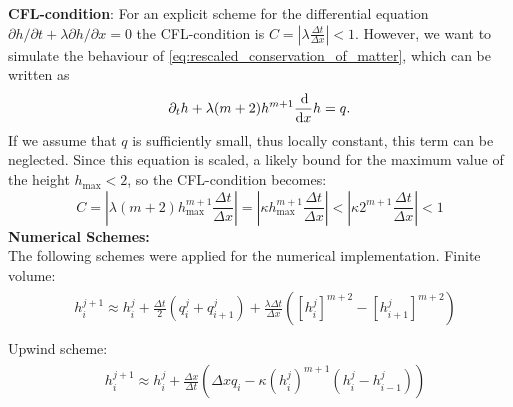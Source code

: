 \textbf{CFL-condition}:
For an explicit scheme for the differential equation $\partial h/\partial t + \lambda \partial h/ \partial x = 0$ the CFL-condition is $C = \left | \lambda \frac{\Delta t}{\Delta x}\right| < 1$.
%
However, we want to simulate the behaviour of \eqref{eq:rescaled_conservation_of_matter}, which can be written as
%
\begin{equation}
    \partial_th+\lambda (m+2)h^{m+1} \frac{\dif}{\dif{x}}h = q.
\end{equation}
%
If we assume that $q$ is sufficiently small, thus locally constant, this term can be neglected. Since this equation is scaled, a likely bound for the maximum value of the height $h_{\text{max}} < 2$, so the CFL-condition becomes:
\begin{equation*}
    C = \left | \lambda (m+2) h_\text{max}^{m+1} \frac{\Delta t}{\Delta x}\right| =\left | \kappa h_{\text{max}}^{m+1} \frac{\Delta t}{\Delta x}\right| < \left | \kappa 2^{m+1} \frac{\Delta t}{\Delta x}\right| < 1
\end{equation*}
%
\textbf{Numerical Schemes:}\\
The following schemes were applied for the numerical implementation.
%
Finite volume:
%
\begin{align} \label{eq:finite_volume_scheme}
    \begin{split}
        & h_i^{j+1} \approx h_i^{j} + \frac{\Delta t}{2} \left (q_i^j + q_{i+1}^j \right) + \frac{\lambda \Delta t}{\Delta x} \left( \left [h_i^j\right]^{m+2} - \left[h_{i+1}^j\right]^{m+2}\right) \\
    \end{split}
\end{align}
%
Upwind scheme:
%
\begin{align} \label{eq:upwind_scheme}
\begin{split}
    & h_i^{j+1} \approx h_i^j + \frac{\Delta x}{\Delta t} \left( \Delta x q_i - \kappa \left( h_i^j \right)^{m+1} \left (h_{i}^j - h_{i-1}^j \right) \right)
    \end{split}
\end{align}
%
